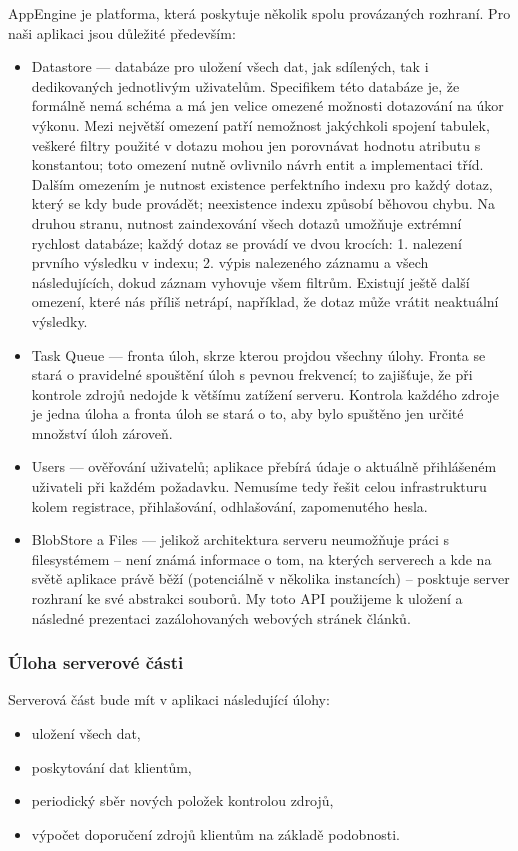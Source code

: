 AppEngine je platforma, která poskytuje několik spolu provázaných rozhraní.
Pro naši aplikaci jsou důležité především:
\begin{itemize}
	\item Datastore --- databáze pro uložení všech dat, jak sdílených, tak i dedikovaných jednotlivým uživatelům.
		Specifikem této databáze je, že formálně nemá schéma a má jen velice omezené možnosti dotazování na úkor výkonu.
		Mezi největší omezení patří nemožnost jakýchkoli spojení tabulek, veškeré filtry použité v dotazu mohou jen porovnávat hodnotu atributu s konstantou; toto omezení nutně ovlivnilo návrh entit a implementaci tříd.
		Dalším omezením je nutnost existence perfektního indexu pro každý dotaz, který se kdy bude provádět; neexistence indexu způsobí běhovou chybu.
		Na druhou stranu, nutnost zaindexování všech dotazů umožňuje extrémní rychlost databáze; každý dotaz se provádí ve dvou krocích:
		1. nalezení prvního výsledku v indexu; 2. výpis nalezeného záznamu a všech následujících, dokud záznam vyhovuje všem filtrům.
		Existují ještě další omezení, které nás příliš netrápí, například, že dotaz může vrátit neaktuální výsledky.
	\item Task Queue --- fronta úloh, skrze kterou projdou všechny úlohy.
		Fronta se stará o pravidelné spouštění úloh s pevnou frekvencí; to zajišťuje, že při kontrole zdrojů nedojde k většímu zatížení serveru.
		Kontrola každého zdroje je jedna úloha a fronta úloh se stará o to, aby bylo spuštěno jen určité množství úloh zároveň.
	\item Users --- ověřování uživatelů; aplikace přebírá údaje o aktuálně přihlášeném uživateli při každém požadavku.
		Nemusíme tedy řešit celou infrastrukturu kolem registrace, přihlašování, odhlašování, zapomenutého hesla.
	\item BlobStore a Files --- jelikož architektura serveru neumožňuje práci s filesystémem -- není známá informace o tom, na kterých serverech a kde na světě aplikace právě běží (potenciálně v několika instancích) -- posktuje server rozhraní ke své abstrakci souborů.
		My toto API použijeme k uložení a následné prezentaci zazálohovaných webových stránek článků.
\end{itemize}

\subsubsection{Úloha serverové části}

Serverová část bude mít v aplikaci následující úlohy:
\begin{itemize}
	\item uložení všech dat,
	\item poskytování dat klientům,
	\item periodický sběr nových položek kontrolou zdrojů,
	\item výpočet doporučení zdrojů klientům na základě podobnosti.
\end{itemize}


